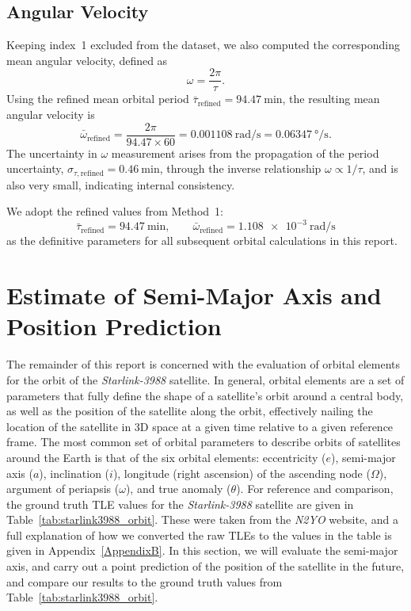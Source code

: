 \documentclass{article}
\begin{document}
\subsection{Angular Velocity}

Keeping index~1 excluded from the dataset, we also computed the corresponding mean angular velocity, defined as \[ \omega = \frac{2\pi}{\tau}. \] Using the refined mean orbital period $\bar{\tau}_{\text{refined}} = \SI{94.47}{\minute}$, the resulting mean angular velocity is \[ \bar{\omega}_{\text{refined}} = \frac{2\pi}{94.47\times60} = \SI{0.001108}{\radian\per\second} = \SI{0.06347}{\degree\per\second}. \] The uncertainty in $\omega$ measurement arises from the propagation of the period uncertainty, $\sigma_{\tau,\text{refined}} = \SI{0.46}{\minute}$, through the inverse relationship $\omega \propto 1/\tau$, and is also very small, indicating internal consistency.

We adopt the refined values from Method~1:
\[
    \boxed{
    \bar{\tau}_{\text{refined}} = \SI{94.47}{\minute}, \qquad 
    \bar{\omega}_{\text{refined}} = \SI{1.108e-3}{\radian\per\second}}
\]
as the definitive parameters for all subsequent orbital calculations in this report.

\section{Estimate of Semi-Major Axis and Position Prediction}

The remainder of this report is concerned with the evaluation of orbital elements for the orbit of the \textit{Starlink-3988} satellite. In general, orbital elements are a set of parameters that fully define the shape of a satellite's orbit around a central body, as well as the position of the satellite along the orbit, effectively nailing the location of the satellite in 3D space at a given time relative to a given reference frame. The most common set of orbital parameters to describe orbits of satellites around the Earth is that of the six orbital elements: eccentricity ($e$), semi-major axis ($a$), inclination ($i$), longitude (right ascension) of the ascending node ($\Omega$), argument of periapsis ($\omega$), and true anomaly ($\theta$). For reference and comparison, the ground truth TLE values for the \textit{Starlink-3988} satellite are given in Table~\ref{tab:starlink3988_orbit}. These were taken from the \textit{N2YO} website, and a full explanation of how we converted the raw TLEs to the values in the table is given in Appendix~\ref{AppendixB}. In this section, we will evaluate the semi-major axis, and carry out a point prediction of the position of the satellite in the future, and compare our results to the ground truth values from Table~\ref{tab:starlink3988_orbit}.
\end{document}
